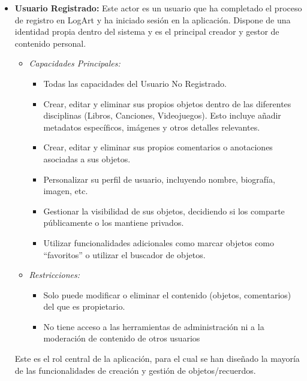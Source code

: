 \begin{itemize}
    \item \textbf{Usuario Registrado:}
    Este actor es un usuario que ha completado el proceso de registro en LogArt y ha iniciado sesión en la aplicación. Dispone de una identidad propia dentro del sistema y es el principal creador y gestor de contenido personal.
    \begin{itemize}
        \item \textit{Capacidades Principales:}
        \begin{itemize}
            \item Todas las capacidades del Usuario No Registrado.
            \item Crear, editar y eliminar sus propios objetos dentro de las diferentes disciplinas (Libros, Canciones, Videojuegos). Esto incluye añadir metadatos específicos, imágenes y otros detalles relevantes.
            \item Crear, editar y eliminar sus propios comentarios o anotaciones asociadas a sus objetos.
            \item Personalizar su perfil de usuario, incluyendo nombre, biografía, imagen, etc.
            \item Gestionar la visibilidad de sus objetos, decidiendo si los comparte públicamente o los mantiene privados.
            \item Utilizar funcionalidades adicionales como marcar objetos como ``favoritos'' o utilizar el buscador de objetos.
        \end{itemize}
    \item \textit{Restricciones:}
    \begin{itemize}
        \item Solo puede modificar o eliminar el contenido (objetos, comentarios) del que es propietario.
        \item No tiene acceso a las herramientas de administración ni a la moderación de contenido de otros usuarios
    \end{itemize}
    \end{itemize}
    Este es el rol central de la aplicación, para el cual se han diseñado la mayoría de las funcionalidades de creación y gestión de objetos/recuerdos.

    \vspace{0.5cm}


\end{itemize}
